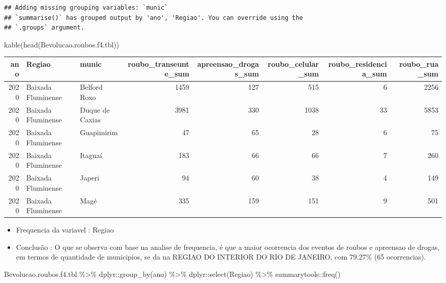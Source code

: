\documentclass[
]{article}
\newenvironment{Shaded}{\begin{snugshade}}{\end{snugshade}}
\newcommand{\FunctionTok}[1]{\textcolor[rgb]{0.00,0.00,0.00}{#1}}
\newcommand{\NormalTok}[1]{#1}
\newcommand{\SpecialCharTok}[1]{\textcolor[rgb]{0.00,0.00,0.00}{#1}}
\begin{document}
\begin{verbatim}
## Adding missing grouping variables: `munic`
## `summarise()` has grouped output by 'ano', 'Regiao'. You can override using the
## `.groups` argument.
\end{verbatim}

\begin{Shaded}
\begin{Highlighting}[]
\FunctionTok{kable}\NormalTok{(}\FunctionTok{head}\NormalTok{(Bevolucao.roubos.f4.tbl))}
\end{Highlighting}
\end{Shaded}

\begin{tabular}{r|l|l|r|r|r|r|r}
\hline
ano & Regiao & munic & roubo\_transeunte\_sum & apreensao\_drogas\_sum & roubo\_celular\_sum & roubo\_residencia\_sum & roubo\_rua\_sum\\
\hline
2020 & Baixada Fluminense & Belford Roxo & 1459 & 127 & 515 & 6 & 2256\\
\hline
2020 & Baixada Fluminense & Duque de Caxias & 3981 & 330 & 1038 & 33 & 5853\\
\hline
2020 & Baixada Fluminense & Guapimirim & 47 & 65 & 28 & 6 & 75\\
\hline
2020 & Baixada Fluminense & Itaguaí & 183 & 66 & 66 & 7 & 260\\
\hline
2020 & Baixada Fluminense & Japeri & 94 & 60 & 38 & 4 & 149\\
\hline
2020 & Baixada Fluminense & Magé & 335 & 159 & 151 & 9 & 501\\
\hline
\end{tabular}

\begin{itemize}
\item
  Frequencia da variavel : Regiao
\item
  Conclusão :
  O que se observa com base na analise de frequencia, é que a maior ocorrencia dos eventos de roubos e apreensao de drogas, em termos de quantidade de municipios, se da na REGIAO DO INTERIOR DO RIO DE JANEIRO, com 79.27\% (65 ocorrencias).
\end{itemize}

\begin{Shaded}
\begin{Highlighting}[]
\NormalTok{Bevolucao.roubos.f4.tbl }\SpecialCharTok{\%\textgreater{}\%}\NormalTok{ dplyr}\SpecialCharTok{::}\FunctionTok{group\_by}\NormalTok{(ano) }\SpecialCharTok{\%\textgreater{}\%}\NormalTok{ dplyr}\SpecialCharTok{::}\FunctionTok{select}\NormalTok{(Regiao) }\SpecialCharTok{\%\textgreater{}\%}\NormalTok{ summarytools}\SpecialCharTok{::}\FunctionTok{freq}\NormalTok{()}
\end{Highlighting}
\end{Shaded}
\end{document}
